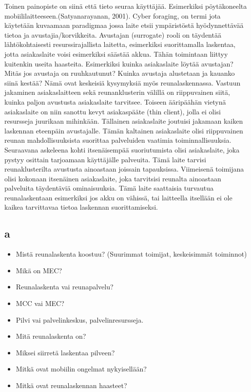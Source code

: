 \documentclass[finnish]{tktltiki2}
\theoremstyle{definition}
\theoremstyle{remark}
\begin{document}
Toinen painopiste on siinä että tieto seuraa käyttäjää. Esimerkiksi pöytäkoneelta mobiililaitteeseen.(Satyanarayanan, 2001).
Cyber foraging, on termi jota käytetään kuvaamaan paradigmaa jossa laite etsii ympäristöstä hyödynnettävää tietoa ja avustajia/korvikkeita. Avustajan (surrogate) rooli on täydentää lähtökohtaisesti resurssirajallista laitetta, esimerkiksi suorittamalla laskentaa, jotta asiakaslaite voisi esimerkiksi säästää akkua.
Tähän toimintaan liittyy kuitenkin useita haasteita. Esimerkiksi kuinka asiakaslaite löytää avustajan? Mitäs jos avustaja on ruuhkautunut? Kuinka avustaja alustetaan ja kauanko siinä kestää? 
Nämä ovat keskeisiä kysymyksiä myös reunalaskennassa. 
Vastuun jakaminen asiakaslaitteen sekä reunanklusterin välillä on riippuvainen siitä, kuinka paljon avustusta asiakaslaite tarvitsee. 
Toiseen ääripäähän vietynä asiakaslaite on niin sanottu kevyt asiakaspääte (thin client), jolla ei olisi resursseja juurikaan mihinkään. Tällainen asiakaslaite joutuisi jakamaan kaiken laskennan eteenpäin avustajalle. 
Tämän kaltainen asiakaslaite olisi riippuvainen reunan mahdollisuuksista suorittaa palveluiden vaatimia toiminnallisuuksia. 
Seuraavana askeleena kohti itsenäisempää suoriutumista olisi asiakaslaite, joka pystyy osittain tarjoamaan käyttäjälle palveuita. Tämä laite tarvisi reunaklusterilta avustusta ainoastaan joissain tapauksissa. 
Viimeisenä toimijana olisi kokonaan itsenäinen asiakaslaite, joka tarvitsisi reunalta ainoastaan palveluita täydentäviä ominaisuuksia.
Tämä laite saattaisia turvautua reunalaskentaan esimerkiksi jos akku on vähissä, tai laitteella itsellään ei ole kaikea tarvittavaa tietoa laskennan suorittamiseksi.

\subsection*{a}
\begin{itemize}
\item Mistä reunalaskenta koostuu? (Suurimmat toimijat, keskeisimmät toiminnot)
\item Mikä on MEC?
\item Reunalaskenta vai reunapalvelu?
\item MCC vai MEC?
\item Pilvi vai palvelinkeskus, palvelinresursseja.
\item Mitä reunalaskenta on?
\item Miksei siirretä laskentaa pilveen?
\item Mitkä ovat mobiilin ongelmat nykyisellään?
\item Mitkä ovat reunalaskennan haasteet?
\end{itemize}
\end{document}
